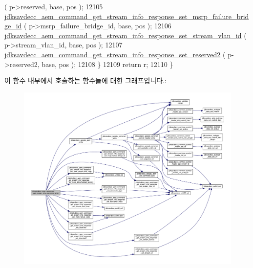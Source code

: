 \begin{DoxyCode}
      ( p->reserved, base, pos );
12105         
      \hyperlink{group__command__get__stream__info__response_ga32f1771b5fecea142206909a4e7d7251}{jdksavdecc\_aem\_command\_get\_stream\_info\_response\_set\_msrp\_failure\_bridge\_id}
      ( p->msrp\_failure\_bridge\_id, base, pos );
12106         \hyperlink{group__command__get__stream__info__response_ga7d6e13c4f3aacb930ad923c95e58f71b}{jdksavdecc\_aem\_command\_get\_stream\_info\_response\_set\_stream\_vlan\_id}
      ( p->stream\_vlan\_id, base, pos );
12107         \hyperlink{group__command__get__stream__info__response_ga3fa8fbd9bb141a344e6cd0f3812f8300}{jdksavdecc\_aem\_command\_get\_stream\_info\_response\_set\_reserved2}
      ( p->reserved2, base, pos );
12108     \}
12109     \textcolor{keywordflow}{return} r;
12110 \}
\end{DoxyCode}


이 함수 내부에서 호출하는 함수들에 대한 그래프입니다.\+:
\nopagebreak
\begin{figure}[H]
\begin{center}
\leavevmode
\includegraphics[width=350pt]{group__command__get__stream__info__response_ga82c64eb455a2ec2e842186243a666b93_cgraph}
\end{center}
\end{figure}


